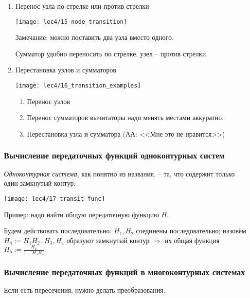 \documentclass[main.tex]{subfiles}
\begin{document}
\begin{enumerate}[noitemsep]
\begin{enumerate}[noitemsep]
    \end{enumerate}

    \item Перенос узла по стрелке или против стрелки

    \texttt{[image: lec4/15\_node\_transition]}

    Замечание: можно поставить два узла вместо одного.

    Сумматор удобно переносить по стрелке, узел -- против стрелки.

    \item Перестановка узлов и сумматоров

    \texttt{[image: lec4/16\_transition\_examples]}

     \begin{enumerate}[noitemsep]
        \item Перенос узлов
        \item Перенос сумматоров
        вычитаторы надо менять местами аккуратно.

        \item Перестановка узла и сумматора (АА: <<Мне это не нравится>>)
    \end{enumerate}
\end{enumerate}

\subsubsection{Вычисление передаточных функций одноконтурных систем}

\emph{Одноконтурная система}, как понятно из названия, -- та, что содержит только один замкнутый контур.

\texttt{[image: lec4/17\_transit\_func]}

Пример: надо найти общую передаточную функцию $ H $.

Будем действовать последовательно.
$ H_1, H_2 $ соединены последовательно; назовём $ H_4 := H_1 H_2 $.
$ H_3, H_4 $ образуют замкнутый контур $ \Rightarrow $ их общая функция $ H_5 := \frac{H_4}{1 + H_3 H_4} $

\subsubsection{Вычисление передаточных функций в многоконтурных системах}

Если есть пересечения, нужно делать преобразования.
\end{document}

